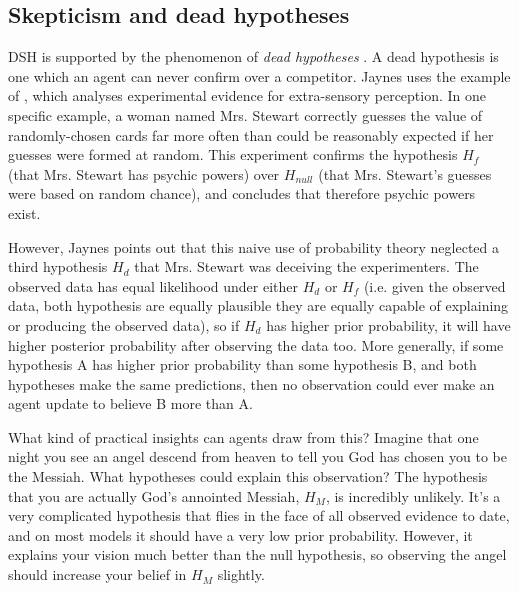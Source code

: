 \documentclass{article}
\begin{document}
\subsection{Skepticism and dead hypotheses}

DSH is supported by the phenomenon of \textit{dead hypotheses} \citep{jaynes2003probability}. A dead hypothesis is one which an agent can never confirm over a competitor. Jaynes uses the example of \citet{soal1954modern}, which analyses experimental evidence for extra-sensory perception. In one specific example, a woman named Mrs. Stewart correctly guesses the value of randomly-chosen cards far more often than could be reasonably expected if her guesses were formed at random. This experiment confirms the hypothesis \(H_{f}\) (that Mrs. Stewart has psychic powers) over \(H_{null}\) (that Mrs. Stewart's guesses were based on random chance), and concludes that therefore psychic powers exist. 

However, Jaynes points out that this naive use of probability theory neglected a third hypothesis \(H_{d}\) \textemdash{} that Mrs. Stewart was deceiving the experimenters. The observed data has equal likelihood under either \(H_{d}\) or \(H_{f}\) (i.e. given the observed data, both hypothesis are equally plausible \textemdash{} they are equally capable of explaining or producing the observed data), so if \(H_{d}\) has higher prior probability, it will have higher posterior probability after observing the data too. More generally, if some hypothesis A has higher prior probability than some hypothesis B, and both hypotheses make the same predictions, then no observation could ever make an agent update to believe B more than A. 

What kind of practical insights can agents draw from this? Imagine that one night you see an angel descend from heaven to tell you God has chosen you to be the Messiah. What hypotheses could explain this observation? The hypothesis that you are actually God's annointed Messiah, \(H_{M}\), is incredibly unlikely. It's a very complicated hypothesis that flies in the face of all observed evidence to date, and on most models it should have a very low prior probability. However, it explains your vision much better than the null hypothesis, so observing the angel should increase your belief in \(H_{M}\) slightly.
\end{document}
